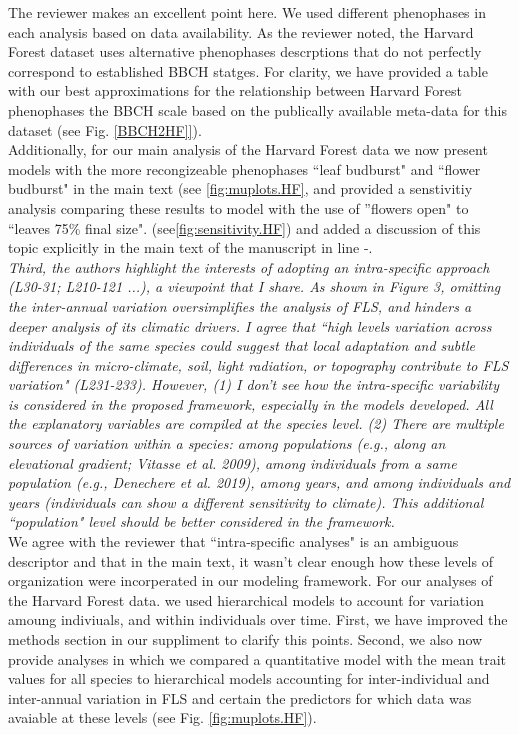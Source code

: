 \documentclass{article}[11pt]
\begin{document}
\noindent The reviewer makes an excellent point here. We used different phenophases in each analysis based on data availability. As the reviewer noted, the Harvard Forest dataset uses alternative phenophases descrptions that do not perfectly correspond to established BBCH statges. For clarity, we have provided a table with our best approximations for the relationship between Harvard Forest phenophases the BBCH scale based on the publically available meta-data for this dataset (see Fig. \ref{BBCH2HF]}).\\

\noindent Additionally, for our main analysis of the Harvard Forest data we now present models with the more recongizeable phenophases ``leaf budburst" and ``flower budburst" in the main text (see \ref{fig:muplots.HF}, and provided a senstivitiy analysis comparing these results to model with the use of ''flowers open" to ``leaves 75\% final size". (see\ref{fig:sensitivity.HF}) and added a discussion of this topic explicitly in the main text of the manuscript in line -.\\  


\emph{Third, the authors highlight the interests of adopting an intra-specific approach (L30-31; L210-121 ...), a viewpoint that I share. As shown in Figure 3, omitting the inter-annual variation oversimplifies the analysis of FLS, and hinders a deeper analysis of its climatic drivers. I agree that ``high levels variation across individuals of the same species could suggest that local adaptation and subtle differences in micro-climate, soil, light radiation, or topography contribute to FLS variation" (L231-233). However, (1) I don't see how the intra-specific variability is considered in the proposed framework, especially in the models developed. All the explanatory variables are compiled at the species level. (2) There are multiple sources of variation within a species: among populations (e.g., along an elevational gradient; Vitasse et al. 2009), among individuals from a same population (e.g., Denechere et al. 2019), among years, and among individuals and years (individuals can show a different sensitivity to climate). This additional ``population" level should be better considered in the framework.}\\

\noindent We agree with the reviewer that ``intra-specific analyses" is an ambiguous descriptor and that in the main text, it wasn't clear enough how these levels of organization were incorperated in our modeling framework. For our analyses of the Harvard Forest data. we used hierarchical models to account for variation amoung indiviuals, and within individuals over time. First, we have improved the methods section in our suppliment to clarify this points. Second, we also now provide analyses in which we compared a quantitative model with the mean trait values for all species to hierarchical models accounting for inter-individual and inter-annual variation in FLS and certain the predictors for which data was avaiable at these levels (see Fig.  \ref{fig:muplots.HF}).\\
\end{document}
